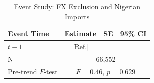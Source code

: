 \begin{table}[htbp]
\centering
\caption{Event Study: FX Exclusion and Nigerian Imports}
\label{tab:event_study}
\begin{tabular}{lccc}
\toprule
Event Time & Estimate & SE & 95\% CI \\
\midrule
$t-1$ & [Ref.] & & \\
\midrule
N & \multicolumn{3}{c}{66,552} \\
Pre-trend $F$-test & \multicolumn{3}{c}{$F = 0.46$, $p = 0.629$} \\
\bottomrule
\end{tabular}
\par{}
\end{table}
